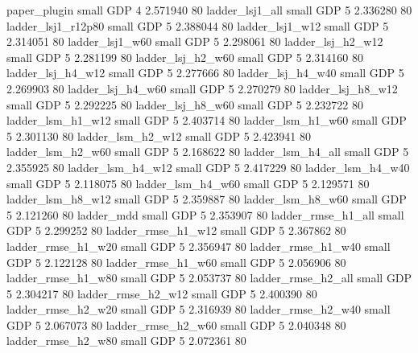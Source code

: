             paper_plugin      small      GDP                 4 2.571940 80
         ladder_lsj1_all      small      GDP                 5 2.336280 80
      ladder_lsj1_r12p80      small      GDP                 5 2.388044 80
         ladder_lsj1_w12      small      GDP                 5 2.314051 80
         ladder_lsj1_w60      small      GDP                 5 2.298061 80
       ladder_lsj_h2_w12      small      GDP                 5 2.281199 80
       ladder_lsj_h2_w60      small      GDP                 5 2.314160 80
       ladder_lsj_h4_w12      small      GDP                 5 2.277666 80
       ladder_lsj_h4_w40      small      GDP                 5 2.269903 80
       ladder_lsj_h4_w60      small      GDP                 5 2.270279 80
       ladder_lsj_h8_w12      small      GDP                 5 2.292225 80
       ladder_lsj_h8_w60      small      GDP                 5 2.232722 80
       ladder_lsm_h1_w12      small      GDP                 5 2.403714 80
       ladder_lsm_h1_w60      small      GDP                 5 2.301130 80
       ladder_lsm_h2_w12      small      GDP                 5 2.423941 80
       ladder_lsm_h2_w60      small      GDP                 5 2.168622 80
       ladder_lsm_h4_all      small      GDP                 5 2.355925 80
       ladder_lsm_h4_w12      small      GDP                 5 2.417229 80
       ladder_lsm_h4_w40      small      GDP                 5 2.118075 80
       ladder_lsm_h4_w60      small      GDP                 5 2.129571 80
       ladder_lsm_h8_w12      small      GDP                 5 2.359887 80
       ladder_lsm_h8_w60      small      GDP                 5 2.121260 80
              ladder_mdd      small      GDP                 5 2.353907 80
      ladder_rmse_h1_all      small      GDP                 5 2.299252 80
      ladder_rmse_h1_w12      small      GDP                 5 2.367862 80
      ladder_rmse_h1_w20      small      GDP                 5 2.356947 80
      ladder_rmse_h1_w40      small      GDP                 5 2.122128 80
      ladder_rmse_h1_w60      small      GDP                 5 2.056906 80
      ladder_rmse_h1_w80      small      GDP                 5 2.053737 80
      ladder_rmse_h2_all      small      GDP                 5 2.304217 80
      ladder_rmse_h2_w12      small      GDP                 5 2.400390 80
      ladder_rmse_h2_w20      small      GDP                 5 2.316939 80
      ladder_rmse_h2_w40      small      GDP                 5 2.067073 80
      ladder_rmse_h2_w60      small      GDP                 5 2.040348 80
      ladder_rmse_h2_w80      small      GDP                 5 2.072361 80
